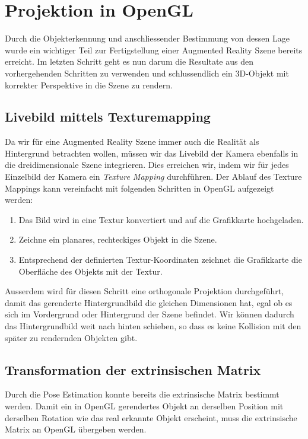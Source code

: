
\chapter{Projektion in OpenGL}

Durch die Objekterkennung und anschliessender Bestimmung von dessen Lage wurde ein wichtiger Teil zur Fertigstellung einer Augmented Reality Szene bereits erreicht. Im letzten Schritt geht es nun darum die Resultate aus den vorhergehenden Schritten zu verwenden und schlussendlich ein 3D-Objekt mit korrekter Perspektive in die Szene zu rendern.


\section{Livebild mittels Texturemapping}

Da wir für eine Augmented Reality Szene immer auch die Realität als Hintergrund betrachten wollen, müssen wir das Livebild der Kamera ebenfalls in die dreidimensionale Szene integrieren. Dies erreichen wir, indem wir für jedes Einzelbild der Kamera ein \textit{Texture Mapping} durchführen.
Der Ablauf des Texture Mappings kann vereinfacht mit folgenden Schritten in OpenGL aufgezeigt werden:

\begin{enumerate}
\item Das Bild wird in eine Textur konvertiert und auf die Grafikkarte hochgeladen.
\item Zeichne ein planares, rechteckiges Objekt in die Szene.
\item Entsprechend der definierten Textur-Koordinaten zeichnet die Grafikkarte die Oberfläche des Objekts mit der Textur.
\end{enumerate}

Ausserdem wird für diesen Schritt eine orthogonale Projektion durchgeführt, damit das gerenderte Hintergrundbild die gleichen Dimensionen hat, egal ob es sich im Vordergrund oder Hintergrund der Szene befindet. Wir können dadurch das Hintergrundbild weit nach hinten schieben, so dass es keine Kollision mit den später zu rendernden Objekten gibt.


\section{Transformation der extrinsischen Matrix}

Durch die Pose Estimation konnte bereits die extrinsische Matrix bestimmt werden. Damit ein in OpenGL gerendertes Objekt an derselben Position mit derselben Rotation wie das real erkannte Objekt erscheint, muss die extrinsische Matrix an OpenGL übergeben werden.


